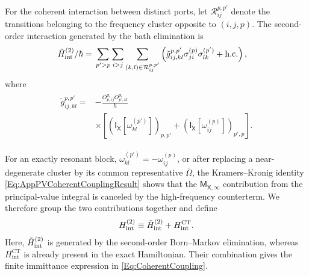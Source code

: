 \documentclass[prx,aps,twocolumn,article]{revtex4-2}
\newcommand{\msf}[1]{\mathsf{#1}}
\newcommand{\hc}{\mathrm{h.c.}}
\newcommand{\msIX}{\msf{I}_\msf{X}}
\newcommand{\msM}{\msf{M}}
\newcommand{\msX}{\msf{X}}
\begin{document}
For the coherent interaction between distinct ports, let
$\mathcal R_{ij}^{p,p'}$ denote the transitions belonging to the frequency
cluster opposite to $(i,j,p)$. The second-order interaction generated by the bath elimination is
\begin{align}
\begin{aligned}
    \tilde{H}_{\rm int}^{(2)}/\hbar
    ={}&
    \sum_{p'>p}
    \sum_{i>j}
    \sum_{(k,l)\in\mathcal R_{ij}^{p,p'}}
    \left(
        \tilde{g}_{ij,kl}^{p,p'}
        \sigma_{ji}^{(p)}
        \sigma_{lk}^{(p')}
        +\hc
    \right),
\end{aligned}
\label{Eq:AECoherentCoupling}
\end{align}
where
\begin{align}
\begin{aligned}
    \tilde{g}_{ij,kl}^{p,p'}
    ={}&
    -
    \frac{
        O_{p,ij}^{\msX}
        O_{p',kl}^{\msX}
    }{\hbar}
    \\
    &\times
    \left[
        \left(
            \msIX[
                \omega_{kl}^{(p')}
            ]
        \right)_{p,p'}
        +
        \left(
            \msIX[
                \omega_{ij}^{(p)}
            ]
        \right)_{p',p}
    \right].
\end{aligned}
\end{align}

For an exactly resonant block,
$\omega_{kl}^{(p')}=-\omega_{ij}^{(p)}$, or after replacing a
near-degenerate cluster by its common representative $\bar\Omega$, the
Kramers--Kronig identity \cref{Eq:AppPVCoherentCouplingResult} shows that
the $\msM_{\msX,\infty}$ contribution from the principal-value integral is
canceled by the high-frequency counterterm. We therefore group the two
contributions together and define
\begin{align}
    H_{\rm int}^{(2)}
    \equiv
    \tilde{H}_{\rm int}^{(2)}
    +
    H_{\mathrm{int}}^{\mathrm{CT}}.
\label{Eq:AppendixTotalInteraction}
\end{align}
Here, $\tilde{H}_{\rm int}^{(2)}$ is generated by the second-order Born--Markov elimination, whereas
$H_{\mathrm{int}}^{\mathrm{CT}}$ is already present in the exact
Hamiltonian. Their combination gives the finite immittance expression in
\cref{Eq:CoherentCoupling}.
\end{document}
